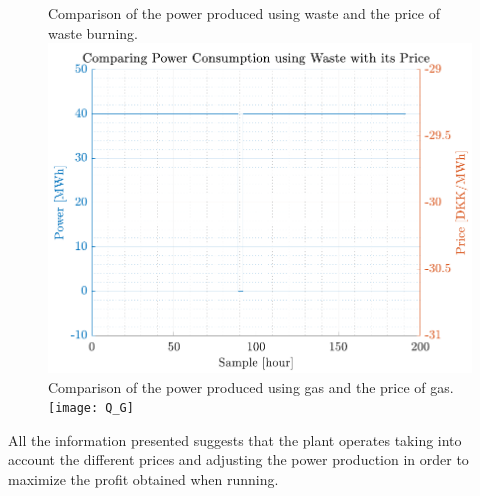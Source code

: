 \begin{figure}[H]
    \captionbox
    {       
        Comparison of the power produced using waste and the price of waste burning.          
        \label{fig:Q_W}                                  
    }                                                                 
    {                                                                  
        \includegraphics[height=.37\textwidth]{figures/Q_W} 
    }                                                                    
    \hspace{5pt}                                                          
    \captionbox  
    {          
        Comparison of the power produced using gas and the price of gas.                                                      
        \label{fig:Q_G}                                     
    }                                                                     
    {                                                                     
        \texttt{[image: Q\_G]}            
    }      
\end{figure}
All the information presented suggests that the plant operates taking into account the different prices and adjusting the power production in order to maximize the profit obtained when running.

